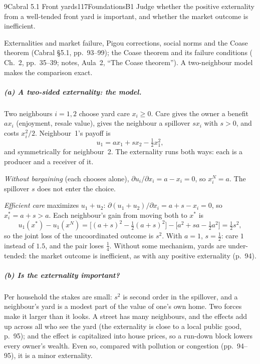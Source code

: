 \begin{exsol}{9}{Cabral 5.1 Front yards}{117}{Foundations}{B1}
\asked Judge whether the positive externality from a well-tended front yard is important, and
whether the market outcome is inefficient.

\method Externalities and market failure, Pigou corrections, social norms and the Coase theorem
(Cabral \S5.1, pp.~93--99); the Coase theorem and its failure conditions (\MR{} Ch.~2, pp.~35--39;
notes, Aula~2, ``The Coase theorem''). A two-neighbour model makes the comparison exact.

\solution
\subparagraph{(a) A two-sided externality: the model.} Two neighbours $i=1,2$ choose yard care
$x_i \ge 0$. Care gives the owner a benefit $a x_i$ (enjoyment, resale value), gives the
neighbour a spillover $s x_i$ with $s>0$, and costs $x_i^2/2$. Neighbour~1's payoff is
\[
u_1 = a x_1 + s x_2 - \tfrac12 x_1^2 ,
\]
and symmetrically for neighbour~2. The externality runs both ways: each is a producer and a
receiver of it.

\emph{Without bargaining} (each chooses alone), $\partial u_i/\partial x_i = a - x_i = 0$, so
$x_i^{N} = a$. The spillover $s$ does not enter the choice.

\emph{Efficient care} maximizes $u_1 + u_2$: $\partial(u_1+u_2)/\partial x_i = a + s - x_i = 0$,
so $x_i^{*} = a + s > a$. Each neighbour's gain from moving both to $x^*$ is
\[
u_1(x^*) - u_1(x^N) = \Big[(a+s)^2 - \tfrac12(a+s)^2\Big] - \Big[a^2 + sa - \tfrac12 a^2\Big]
= \tfrac12 s^2 ,
\]
so the joint loss of the uncoordinated outcome is $s^2$. With $a=1$, $s=\tfrac12$: care $1$
instead of $1.5$, and the pair loses $\tfrac14$. Without some mechanism, yards are
under-tended: the market outcome is inefficient, as with any positive externality (p.~94).

\subparagraph{(b) Is the externality important?} Per household the stakes are small: $s^2$ is
second order in the spillover, and a neighbour's yard is a modest part of the value of one's own
home. Two forces make it larger than it looks. A street has many neighbours, and the effects add
up across all who see the yard (the externality is close to a local public good, p.~95); and the
effect is capitalized into house prices, so a run-down block lowers every owner's wealth. Even
so, compared with pollution or congestion (pp.~94--95), it is a minor externality.


\end{exsol}
